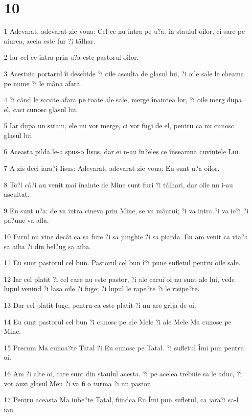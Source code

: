 \chapter{10}

\par 1 Adevarat, adevarat zic voua: Cel ce nu intra pe u?a, în staulul oilor, ci sare pe aiurea, acela este fur ?i tâlhar.
\par 2 Iar cel ce intra prin u?a este pastorul oilor.
\par 3 Acestuia portarul îi deschide ?i oile asculta de glasul lui, ?i oile sale le cheama pe nume ?i le mâna afara.
\par 4 ?i când le scoate afara pe toate ale sale, merge înaintea lor, ?i oile merg dupa el, caci cunosc glasul lui.
\par 5 Iar dupa un strain, ele nu vor merge, ci vor fugi de el, pentru ca nu cunosc glasul lui.
\par 6 Aceasta pilda le-a spus-o Iisus, dar ei n-au în?eles ce înseamna cuvintele Lui.
\par 7 A zis deci iara?i Iisus: Adevarat, adevarat zic voua: Eu sunt u?a oilor.
\par 8 To?i câ?i au venit mai înainte de Mine sunt furi ?i tâlhari, dar oile nu i-au ascultat.
\par 9 Eu sunt u?a: de va intra cineva prin Mine, se va mântui; ?i va intra ?i va ie?i ?i pa?une va afla.
\par 10 Furul nu vine decât ca sa fure ?i sa junghie ?i sa piarda. Eu am venit ca via?a sa aiba ?i din bel?ug sa aiba.
\par 11 Eu sunt pastorul cel bun. Pastorul cel bun î?i pune sufletul pentru oile sale.
\par 12 Iar cel platit ?i cel care nu este pastor, ?i ale carui oi nu sunt ale lui, vede lupul venind ?i lasa oile ?i fuge; ?i lupul le rape?te ?i le risipe?te.
\par 13 Dar cel platit fuge, pentru ca este platit ?i nu are grija de oi.
\par 14 Eu sunt pastorul cel bun ?i cunosc pe ale Mele ?i ale Mele Ma cunosc pe Mine.
\par 15 Precum Ma cunoa?te Tatal ?i Eu cunosc pe Tatal. ?i sufletul Îmi pun pentru oi.
\par 16 Am ?i alte oi, care sunt din staulul acesta. ?i pe acelea trebuie sa le aduc, ?i vor auzi glasul Meu ?i va fi o turma ?i un pastor.
\par 17 Pentru aceasta Ma iube?te Tatal, fiindca Eu Îmi pun sufletul, ca iara?i sa-l iau.
